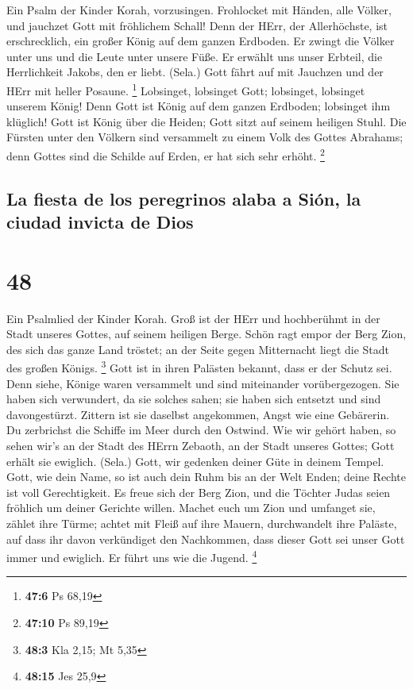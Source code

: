  Ein Psalm der Kinder Korah, vorzusingen. 
Frohlocket mit Händen, alle Völker, und jauchzet Gott mit fröhlichem
Schall!  Denn der HErr, der Allerhöchste, ist
erschrecklich, ein großer König auf dem ganzen Erdboden. 
Er zwingt die Völker unter uns und die Leute unter unsere Füße.
 Er erwählt uns unser Erbteil, die Herrlichkeit Jakobs,
den er liebt. (Sela.)  Gott fährt auf mit Jauchzen und der
HErr mit heller Posaune. \footnote{\textbf{47:6} Ps 68,19}
 Lobsinget, lobsinget Gott; lobsinget, lobsinget unserem
König!  Denn Gott ist König auf dem ganzen Erdboden;
lobsinget ihm klüglich!  Gott ist König über die Heiden;
Gott sitzt auf seinem heiligen Stuhl.  Die Fürsten unter
den Völkern sind versammelt zu einem Volk des Gottes Abrahams; denn
Gottes sind die Schilde auf Erden, er hat sich sehr erhöht. \footnote{\textbf{47:10}
  Ps 89,19}

\hypertarget{la-fiesta-de-los-peregrinos-alaba-a-siuxf3n-la-ciudad-invicta-de-dios}{%
\subsection{La fiesta de los peregrinos alaba a Sión, la ciudad invicta
de
Dios}\label{la-fiesta-de-los-peregrinos-alaba-a-siuxf3n-la-ciudad-invicta-de-dios}}

\hypertarget{section-47}{%
\section{48}\label{section-47}}

 Ein Psalmlied der Kinder Korah.  Groß ist
der HErr und hochberühmt in der Stadt unseres Gottes, auf seinem
heiligen Berge.  Schön ragt empor der Berg Zion, des sich
das ganze Land tröstet; an der Seite gegen Mitternacht liegt die Stadt
des großen Königs. \footnote{\textbf{48:3} Kla 2,15; Mt 5,35}
 Gott ist in ihren Palästen bekannt, dass er der Schutz
sei.  Denn siehe, Könige waren versammelt und sind
miteinander vorübergezogen.  Sie haben sich verwundert, da
sie solches sahen; sie haben sich entsetzt und sind davongestürzt.
 Zittern ist sie daselbst angekommen, Angst wie eine
Gebärerin.  Du zerbrichst die Schiffe im Meer durch den
Ostwind.  Wie wir gehört haben, so sehen wir's an der
Stadt des HErrn Zebaoth, an der Stadt unseres Gottes; Gott erhält sie
ewiglich. (Sela.)  Gott, wir gedenken deiner Güte in
deinem Tempel.  Gott, wie dein Name, so ist auch dein
Ruhm bis an der Welt Enden; deine Rechte ist voll Gerechtigkeit.
 Es freue sich der Berg Zion, und die Töchter Judas seien
fröhlich um deiner Gerichte willen.  Machet euch um Zion
und umfanget sie, zählet ihre Türme;  achtet mit Fleiß
auf ihre Mauern, durchwandelt ihre Paläste, auf dass ihr davon
verkündiget den Nachkommen,  dass dieser Gott sei unser
Gott immer und ewiglich. Er führt uns wie die Jugend. \footnote{\textbf{48:15}
  Jes 25,9}

